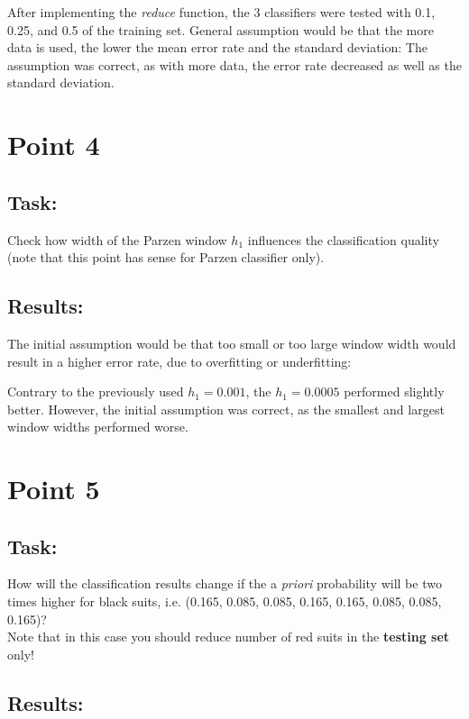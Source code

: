 \documentclass[
  a4paper,            %
  DIV=10,             %
  oneside,            %
  BCOR=5mm,           %
  parskip=half,       %
  numbers=noenddot,   %
  bibtotoc,           %
  listof=totoc        %
]{scrreprt}
\begin{document}
After implementing the \textit{reduce} function, the 3 classifiers were tested with 0.1, 0.25, and 0.5 of the training set.
General assumption would be that the more data is used, the lower the mean error rate and the standard deviation:
The assumption was correct, as with more data, the error rate decreased as well as the standard deviation.
\section*{Point 4}
\subsection*{Task:}
Check how width of the Parzen window $h_{1}$ influences the classification quality (note that this point has sense for Parzen classifier only).
\subsection*{Results:}

The initial assumption would be that too small or too large window width would result in a higher error rate, due to overfitting or underfitting:


Contrary to the previously used $h_{1} = 0.001$, the $h_{1} = 0.0005$ performed slightly better.
However, the initial assumption was correct, as the smallest and largest window widths performed worse.

\section*{Point 5}
\subsection*{Task:}
How will the classification results change if the a \textit{priori} probability will be two times higher for black suits, i.e. (0.165, 0.085, 0.085, 0.165, 0.165, 0.085, 0.085, 0.165)?
\\
Note that in this case you should reduce number of red suits in the \textbf{testing set} only!
\subsection*{Results:}
\end{document}
